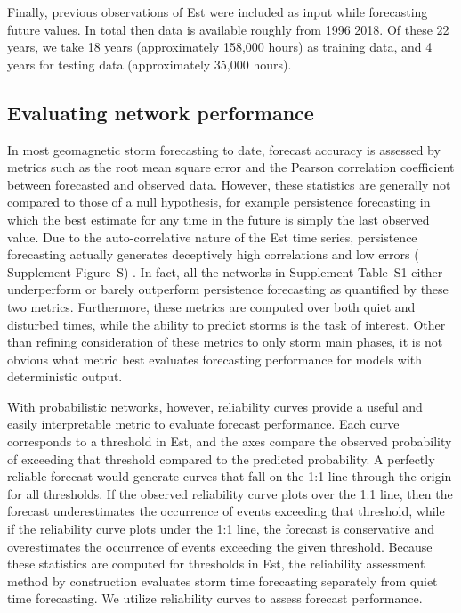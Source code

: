 Finally, previous observations of Est were included as input while forecasting future values. In total then data is available roughly from 1996  2018. Of these 22 years, we take 18 years (approximately 158,000 hours) as training data, and 4 years for testing data (approximately 35,000 hours).


\subsection{Evaluating network performance}
In most geomagnetic storm forecasting to date, forecast accuracy is assessed by metrics such as the root mean square error and the Pearson correlation coefficient between forecasted and observed data. However, these statistics are generally not compared to those of a null hypothesis, for example persistence forecasting in which the best estimate for any time in the future is simply the last observed value. Due to the auto-correlative nature of the Est time series, persistence forecasting actually generates deceptively high correlations and low errors ( Supplement Figure~S) \citep{Shprits2019}. In fact, all the networks in Supplement Table~S1 either underperform or barely outperform persistence forecasting as quantified by these two metrics. Furthermore, these metrics are computed over both quiet and disturbed times, while the ability to predict storms is the task of interest. Other than refining consideration of these metrics to only storm main phases, it is not obvious what metric best evaluates forecasting performance for models with deterministic output. 

With probabilistic networks, however, reliability curves provide a useful and easily interpretable metric to evaluate forecast performance. Each curve corresponds to a threshold in Est, and the axes compare the observed probability of exceeding that threshold compared to the predicted probability. A perfectly reliable forecast would generate curves that fall on the 1:1 line through the origin for all thresholds. If the observed reliability curve plots over the 1:1 line, then the forecast underestimates the occurrence of events exceeding that threshold, while if the reliability curve plots under the 1:1 line, the forecast is conservative and overestimates the occurrence of events exceeding the given threshold. Because these statistics are computed for thresholds in Est, the reliability assessment method by construction evaluates storm time forecasting separately from quiet time forecasting. We utilize reliability curves to assess forecast performance. 

